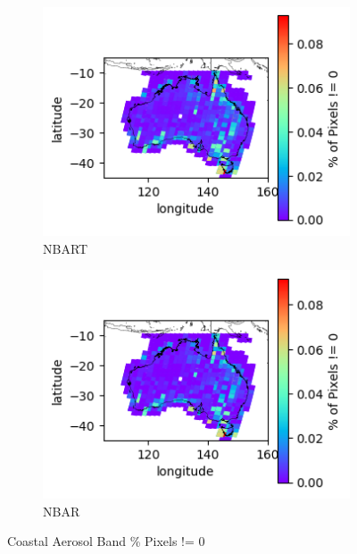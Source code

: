 \documentclass[a4paper]{article}
\begin{document}
      \begin{figure}[h!]
        \centering
          \begin{subfigure}[l]{.4\linewidth}
            \hspace{-32mm}
            \includegraphics[scale=0.9]{plots/nbart/nbart_coastal_aerosol-PercentDifferent.png}
            \caption{NBART}
          \end{subfigure}
%
          \begin{subfigure}[r]{.4\linewidth}
            \includegraphics[scale=0.9]{plots/nbar/nbar_coastal_aerosol-PercentDifferent.png}
            \caption{NBAR}
          \end{subfigure}
        \caption{Coastal Aerosol Band \% Pixels != 0}\label{figure:15}
      \end{figure}
\end{document}

